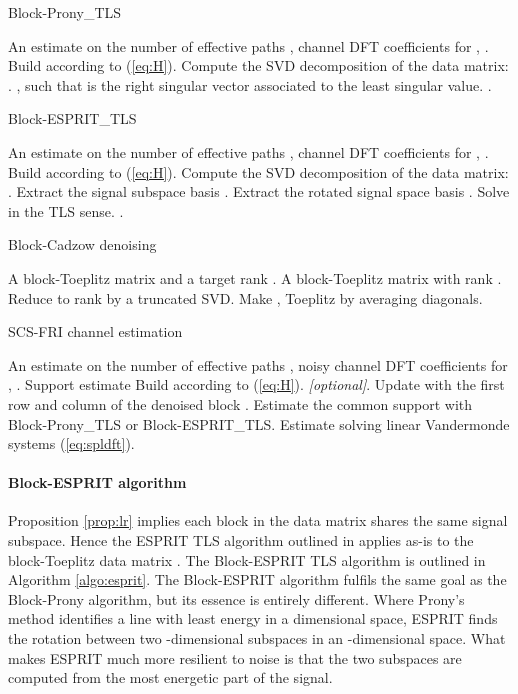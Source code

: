 \documentclass[journal,10pt]{IEEEtran}
\begin{document}
\begin{algorithm}[t]
\caption{Block-Prony\_TLS}
\begin{algorithmic}[1]
\REQUIRE An estimate on the number of effective paths ,  channel DFT coefficients  for , .
\STATE Build  according to (\ref{eq:H}).
\STATE Compute the SVD decomposition of the data matrix: .
\STATE , such that  is the right singular vector associated to the least singular value.
\RETURN .
\end{algorithmic}\label{algo:prony}
\end{algorithm}
\begin{algorithm}[t]
\caption{Block-ESPRIT\_TLS}
\begin{algorithmic}[1]
\REQUIRE An estimate on the number of effective paths ,  channel DFT coefficients  for , .
\STATE Build  according to (\ref{eq:H}).
\STATE Compute the SVD decomposition of the data matrix: .
\STATE Extract the signal subspace basis .
\STATE Extract the rotated signal space basis .
\STATE Solve  in the TLS sense.
\RETURN .
\end{algorithmic}\label{algo:esprit}
\end{algorithm}
\begin{algorithm}[t!]
\caption{Block-Cadzow denoising}
\begin{algorithmic}[1]
\REQUIRE A block-Toeplitz matrix  and a target rank .
\ENSURE  A block-Toeplitz matrix  with rank .
\REPEAT
\STATE Reduce  to rank  by a truncated SVD.
\STATE Make  , Toeplitz by averaging diagonals.
\end{algorithmic}\label{algo:blockcadzow}
\end{algorithm}
\begin{algorithm}[h!]
\caption{SCS-FRI channel estimation}
\begin{algorithmic}[1]
\REQUIRE An estimate on the number of effective paths ,  noisy channel DFT coefficients  for , .
\ENSURE  Support estimate 
\STATE Build  according to (\ref{eq:H}).
\STATE  \emph{[optional]}.
\STATE Update  with the first row and column of the denoised block .
\STATE Estimate the common support with Block-Prony\_TLS or Block-ESPRIT\_TLS.
\STATE Estimate   solving  linear Vandermonde systems (\ref{eq:spldft}).
\end{algorithmic}\label{algo:csfri}
\end{algorithm}
\paragraph{Block-ESPRIT algorithm} 
Proposition \ref{prop:lr} implies each block in the data matrix shares the same signal subspace. Hence the ESPRIT TLS algorithm outlined in \cite{Roy1989} applies as-is to the block-Toeplitz data matrix . The Block-ESPRIT TLS algorithm is outlined in Algorithm \ref{algo:esprit}.
 The Block-ESPRIT algorithm fulfils the same goal as the Block-Prony algorithm, but its essence is entirely different. Where Prony's method identifies a line with least energy in a  dimensional space, ESPRIT finds the rotation between two -dimensional subspaces in an -dimensional space. What makes ESPRIT much more resilient to noise is that the two subspaces are computed from the most energetic part of the signal.
\end{document}
